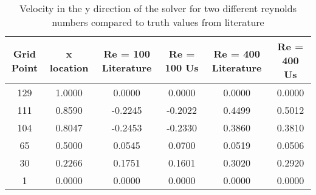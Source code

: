 \begin{table*}
	\begin{center}
		\begin{tabular} { |c|c|c|c|c|c| }

\hline			Grid Point & x location & Re = 100 Literature & Re = 100 Us & Re = 400 Literature & Re = 400 Us\\ \hline 
			129 & 1.0000 & 0.0000 & 0.0000 & 0.0000 & 0.0000\\ \hline 
			111 & 0.8590 & -0.2245 & -0.2022 & 0.4499 & 0.5012\\ \hline 
			104 & 0.8047 & -0.2453 & -0.2330 & 0.3860 & 0.3810\\ \hline 
			65 & 0.5000 & 0.0545 & 0.0700 & 0.0519 & 0.0506\\ \hline 
			30 & 0.2266 & 0.1751 & 0.1601 & 0.3020 & 0.2920\\ \hline 
			1 & 0.0000 & 0.0000 & 0.0000 & 0.0000 & 0.0000\\ \hline 
		\end{tabular}
		\caption{Velocity in the y direction of the solver for two different reynolds numbers compared to truth values from literature}
		\label{table_v_vel}
	\end{center}
\end{table*}
